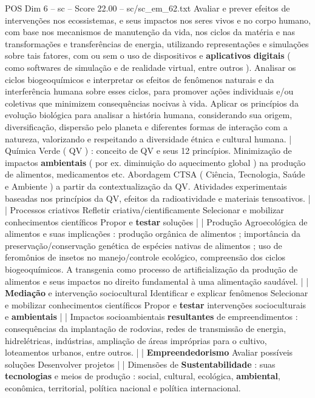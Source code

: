 \begin{textsample}{POS Dim 6 – sc – Score 22.00 – sc/sc\_em\_62.txt}
Avaliar e prever efeitos de intervenções nos ecossistemas, e seus impactos nos seres vivos e no corpo humano, com base nos mecanismos de manutenção da vida, nos ciclos da matéria e nas transformações e transferências de energia, utilizando representações e simulações sobre tais fatores, com ou sem o uso de dispositivos e \textbf{aplicativos} \textbf{digitais} ( como softwares de simulação e de realidade virtual, entre outros ).
Analisar os ciclos biogeoquímicos e interpretar os efeitos de fenômenos naturais e da interferência humana sobre esses ciclos, para promover ações individuais e/ou coletivas que minimizem consequências nocivas à vida.
Aplicar os princípios da evolução biológica para analisar a história humana, considerando sua origem, diversificação, dispersão pelo planeta e diferentes formas de interação com a natureza, valorizando e respeitando a diversidade étnica e cultural humana. | Química Verde ( QV ) : conceito de QV e seus 12 princípios.
Minimização de impactos \textbf{ambientais} ( por ex. diminuição do aquecimento global ) na produção de alimentos, medicamentos etc.
Abordagem CTSA ( Ciência, Tecnologia, Saúde e Ambiente ) a partir da contextualização da QV.
Atividades experimentais baseadas nos princípios da QV, efeitos da radioatividade e materiais tensoativos. | | Processos criativos Refletir criativa/cientificamente Selecionar e mobilizar conhecimentos científicos Propor e \textbf{testar} soluções | | Produção Agroecológica de alimentos e suas implicações : produção orgânica de alimentos ; importância da preservação/conservação genética de espécies nativas de alimentos ; uso de feromônios de insetos no manejo/controle ecológico, compreensão dos ciclos biogeoquímicos.
A transgenia como processo de artificialização da produção de alimentos e seus impactos no direito fundamental à uma alimentação saudável. | | \textbf{Mediação} e intervenção sociocultural Identificar e explicar fenômenos Selecionar e mobilizar conhecimentos científicos Propor e \textbf{testar} intervenções socioculturais e \textbf{ambientais} | | Impactos socioambientais \textbf{resultantes} de empreendimentos : consequências da implantação de rodovias, redes de transmissão de energia, hidrelétricas, indústrias, ampliação de áreas impróprias para o cultivo, loteamentos urbanos, entre outros. | | \textbf{Empreendedorismo} Avaliar possíveis soluções Desenvolver projetos | | Dimensões de \textbf{Sustentabilidade} : suas \textbf{tecnologias} e meios de produção : social, cultural, ecológica, \textbf{ambiental}, econômica, territorial, política nacional e política internacional.

\end{textsample}
